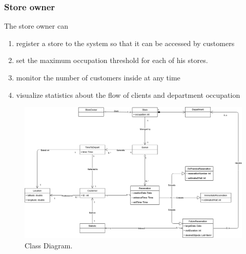 \subsubsection{Store owner}
The store owner can
\begin{enumerate}
	\item register a store to the system so that it can be accessed by customers
	\item set the maximum occupation threshold for each of his stores.
	\item monitor the number of customers inside at any time
	\item visualize statistics about the flow of clients and department occupation
\end{enumerate}
\begin{figure}[!htb]
\centering
\includegraphics[width=\textwidth]{Images/ClassDiagram.png}
\caption{\label{fig:metamodel2}Class Diagram.}
\end{figure}
\newpage
